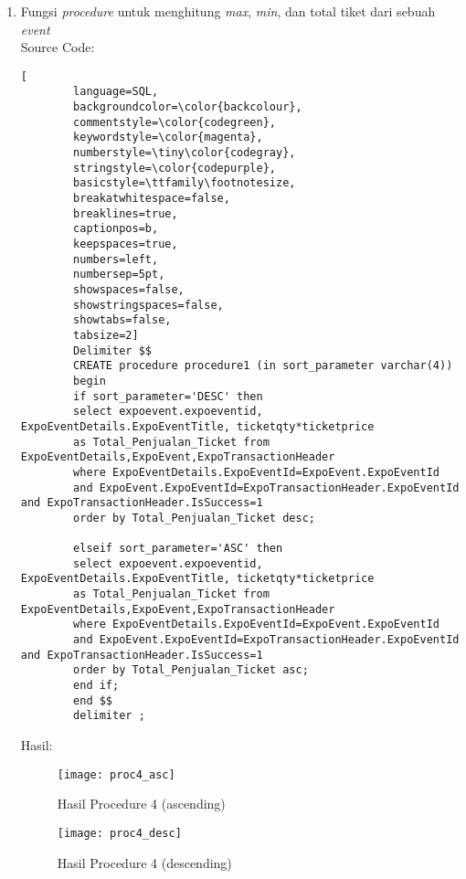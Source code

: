 \begin{enumerate}
	\item 	Fungsi \textit{procedure} untuk menghitung \textit{max}, \textit{min}, dan total tiket dari sebuah \textit{event} \\
	Source Code:
	\begin{lstlisting}[
		language=SQL,
		backgroundcolor=\color{backcolour},   
		commentstyle=\color{codegreen},
		keywordstyle=\color{magenta},
		numberstyle=\tiny\color{codegray},
		stringstyle=\color{codepurple},
		basicstyle=\ttfamily\footnotesize,
		breakatwhitespace=false,         
		breaklines=true,                 
		captionpos=b,                    
		keepspaces=true,                 
		numbers=left,                    
		numbersep=5pt,                  
		showspaces=false,                
		showstringspaces=false,
		showtabs=false,                  
		tabsize=2]
		Delimiter $$
		CREATE procedure procedure1 (in sort_parameter varchar(4))
		begin
		if sort_parameter='DESC' then
		select expoevent.expoeventid, ExpoEventDetails.ExpoEventTitle, ticketqty*ticketprice
		as Total_Penjualan_Ticket from ExpoEventDetails,ExpoEvent,ExpoTransactionHeader
		where ExpoEventDetails.ExpoEventId=ExpoEvent.ExpoEventId 
		and ExpoEvent.ExpoEventId=ExpoTransactionHeader.ExpoEventId and ExpoTransactionHeader.IsSuccess=1 
		order by Total_Penjualan_Ticket desc;
		
		elseif sort_parameter='ASC' then
		select expoevent.expoeventid, ExpoEventDetails.ExpoEventTitle, ticketqty*ticketprice
		as Total_Penjualan_Ticket from ExpoEventDetails,ExpoEvent,ExpoTransactionHeader
		where ExpoEventDetails.ExpoEventId=ExpoEvent.ExpoEventId 
		and ExpoEvent.ExpoEventId=ExpoTransactionHeader.ExpoEventId and ExpoTransactionHeader.IsSuccess=1 
		order by Total_Penjualan_Ticket asc;
		end if;
		end $$
		delimiter ;
	\end{lstlisting}
	Hasil:
	\\
	\begin{figure}[H]
		\centering
		\texttt{[image: proc4\_asc]}
		\caption{Hasil Procedure 4 (ascending)}
	\end{figure}
	\begin{figure}[H]
		\centering
		\texttt{[image: proc4\_desc]}
		\caption{Hasil Procedure 4 (descending)}
	\end{figure}


\end{enumerate}
